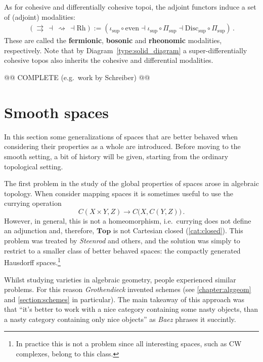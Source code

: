     \begin{property}
        As for cohesive and differentially cohesive topoi, the adjoint functors induce a set of (adjoint) modalities:
        \begin{gather}
            (\rightrightarrows\,\dashv\,\rightsquigarrow\,\dashv\mathrm{Rh}):=(\iota_{\text{sup}}\circ\mathrm{even}\dashv\iota_{\text{sup}}\circ\Pi_{\text{sup}}\dashv\mathrm{Disc}_{\text{sup}}\circ\Pi_{\text{sup}})\,.
        \end{gather}
        These are called the \textbf{fermionic}, \textbf{bosonic} and \textbf{rheonomic} modalities, respectively. Note that by Diagram~\ref{type:solid_diagram} a super-differentially cohesive topos also inherits the cohesive and differential modalities.
    \end{property}

    @@ COMPLETE (e.g.~work by Schreiber) @@

\section{Smooth spaces}\label{section:smooth_spaces}

    In this section some generalizations of spaces that are better behaved when considering their properties as a whole are introduced. Before moving to the smooth setting, a bit of history will be given, starting from the ordinary topological setting.

    The first problem in the study of the global properties of spaces arose in algebraic topology. When consider mapping spaces it is sometimes useful to use the currying operation \[C(X\times Y,Z)\rightarrow C\bigl(X,C(Y,Z)\bigr)\,.\] However, in general, this is not a homeomorphism, i.e.~currying does not define an adjunction and, therefore, $\mathbf{Top}$ is not Cartesian closed (\cref{cat:closed}). This problem was treated by \textit{Steenrod} and others, and the solution was simply to restrict to a smaller class of better behaved spaces: the compactly generated Hausdorff spaces.\footnote{In practice this is not a problem since all interesting spaces, such as CW complexes, belong to this class.}

    Whilst studying varieties in algebraic geometry, people experienced similar problems. For this reason \textit{Grothendieck} invented schemes (see \cref{chapter:alggeom} and \cref{section:schemes} in particular). The main takeaway of this approach was that ``it's better to work with a nice category containing some nasty objects, than a nasty category containing only nice objects'' as \textit{Baez} phrases it succintly.

